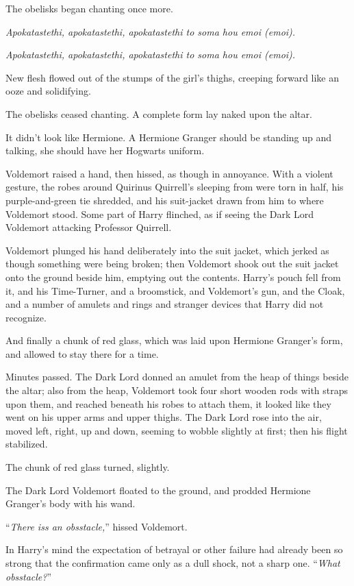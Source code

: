 The obelisks began chanting once more.

\emph{Apokatastethi, apokatastethi, apokatastethi to soma hou emoi (emoi).}

\emph{Apokatastethi, apokatastethi, apokatastethi to soma hou emoi (emoi).}

New flesh flowed out of the stumps of the girl's thighs, creeping forward like an ooze and solidifying.

The obelisks ceased chanting. A complete form lay naked upon the altar.

It didn't look like Hermione. A Hermione Granger should be standing up and talking, she should have her Hogwarts uniform.

Voldemort raised a hand, then hissed, as though in annoyance. With a violent gesture, the robes around Quirinus Quirrell's sleeping from were torn in half, his purple-and-green tie shredded, and his suit-jacket drawn from him to where Voldemort stood. Some part of Harry flinched, as if seeing the Dark Lord Voldemort attacking Professor Quirrell.

Voldemort plunged his hand deliberately into the suit jacket, which jerked as though something were being broken; then Voldemort shook out the suit jacket onto the ground beside him, emptying out the contents. Harry's pouch fell from it, and his Time-Turner, and a broomstick, and Voldemort's gun, and the Cloak, and a number of amulets and rings and stranger devices that Harry did not recognize.

And finally a chunk of red glass, which was laid upon Hermione Granger's form, and allowed to stay there for a time.

Minutes passed. The Dark Lord donned an amulet from the heap of things beside the altar; also from the heap, Voldemort took four short wooden rods with straps upon them, and reached beneath his robes to attach them, it looked like they went on his upper arms and upper thighs. The Dark Lord rose into the air, moved left, right, up and down, seeming to wobble slightly at first; then his flight stabilized.

The chunk of red glass turned, slightly.

The Dark Lord Voldemort floated to the ground, and prodded Hermione Granger's body with his wand.

``\emph{There iss an obsstacle,}'' hissed Voldemort.

In Harry's mind the expectation of betrayal or other failure had already been so strong that the confirmation came only as a dull shock, not a sharp one. ``\emph{What obsstacle?}''

